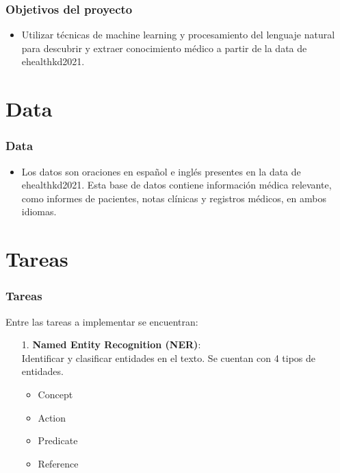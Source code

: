 \documentclass[
11pt, %
%
aspectratio=169, %
]{beamer}
\begin{document}
	\begin{frame}
		\frametitle{Objetivos del proyecto}
		\begin{itemize}
			\item Utilizar técnicas de machine learning y procesamiento del lenguaje natural para descubrir y extraer conocimiento médico a partir de la data de ehealthkd2021.
			
			
		\end{itemize}
	 	
	
	
	\end{frame}

     \section{Data}
     \begin{frame}
     	\frametitle{Data}
     	\begin{itemize}
     		\item Los datos son oraciones en español e inglés presentes en la data de ehealthkd2021. Esta base de datos contiene información médica relevante, como informes de pacientes, notas clínicas y registros médicos, en ambos idiomas.
     		
     	\end{itemize}
     
     	
     \end{frame}
     
     \section{Tareas}
     
     \begin{frame}
     	\frametitle{Tareas}
     	Entre las tareas a implementar se encuentran:
     	\begin{enumerate}
     		\item[1.] \textbf{ Named Entity Recognition (NER)}: \\
     		
     		Identificar y clasificar entidades en el texto. Se cuentan con 4 tipos de entidades.
     		\begin{itemize}
     			\item Concept
     			\item Action
     			\item Predicate
     			\item Reference
     		\end{itemize}
     		
     	\end{enumerate}
     	
     	
     \end{frame}
 
\end{document}
